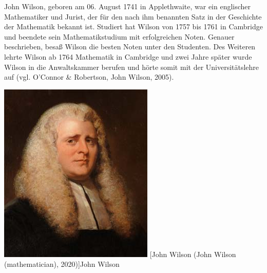 \begin{minipage}{0.65\linewidth}
John Wilson, geboren am 06. August 1741 in Applethwaite,
war ein englischer Mathematiker und Jurist, der für den
nach ihm benannten Satz in der Geschichte der Mathematik
bekannt ist. Studiert hat Wilson von 1757 bis 1761 in
Cambridge und beendete sein Mathematikstudium mit
erfolgreichen Noten. Genauer beschrieben, besaß Wilson
die besten Noten unter den Studenten. Des Weiteren
lehrte Wilson ab 1764 Mathematik in Cambridge und zwei
Jahre später wurde Wilson in die Anwaltskammer berufen
und hörte somit mit der Universitätslehre auf
(vgl. O'Connor \& Robertson, John Wilson, 2005).
\end{minipage}
\hfil
\begin{minipage}[r]{0.3\linewidth}
  \captionsetup{type=figure,font=small,skip=6pt,format=plain}%
  \capstart
  \includegraphics[width=1.0\linewidth]{./images/john_wilson.jpeg}
  [John Wilson (John Wilson (mathematician), 2020)]{John Wilson}
  \label{fig:portrait_wilson}
\end{minipage}
\vspace{.3cm}

